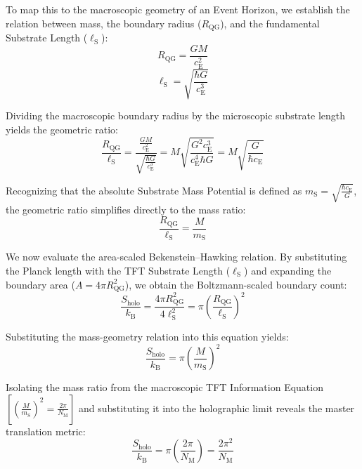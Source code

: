 To map this to the macroscopic geometry of an Event Horizon, we establish the relation between mass, the boundary radius ($R_{\mathrm{QG}}$), and the fundamental Substrate Length ($\ell_{\mathrm{S}}$):
\begin{equation}
    R_{\mathrm{QG}} = \frac{GM}{c_{\mathrm{E}}^2}
\end{equation}
\begin{equation}
    \ell_{\mathrm{S}} = \sqrt{\frac{\hbar G}{c_{\mathrm{E}}^3}}
\end{equation}

Dividing the macroscopic boundary radius by the microscopic substrate length yields the geometric ratio:
\begin{equation}
    \frac{R_{\mathrm{QG}}}{\ell_{\mathrm{S}}} = \frac{\frac{GM}{c_{\mathrm{E}}^2}}{\sqrt{\frac{\hbar G}{c_{\mathrm{E}}^3}}} = M \sqrt{\frac{G^2 c_{\mathrm{E}}^3}{c_{\mathrm{E}}^4 \hbar G}} = M \sqrt{\frac{G}{\hbar c_{\mathrm{E}}}}
\end{equation}

Recognizing that the absolute Substrate Mass Potential is defined as $m_{\mathrm{S}} = \sqrt{\frac{\hbar c_{\mathrm{E}}}{G}}$, the geometric ratio simplifies directly to the mass ratio:
\begin{equation}
    \frac{R_{\mathrm{QG}}}{\ell_{\mathrm{S}}} = \frac{M}{m_{\mathrm{S}}}
\end{equation}

We now evaluate the area-scaled Bekenstein--Hawking relation. By substituting the Planck length with the TFT Substrate Length ($\ell_{\mathrm{S}}$) and expanding the boundary area ($A = 4\pi R_{\mathrm{QG}}^2$), we obtain the Boltzmann-scaled boundary count:
\begin{equation}
    \frac{S_{\mathrm{holo}}}{k_{\mathrm{B}}} = \frac{4\pi R_{\mathrm{QG}}^2}{4\ell_{\mathrm{S}}^2} = \pi \left(\frac{R_{\mathrm{QG}}}{\ell_{\mathrm{S}}}\right)^2
\end{equation}

Substituting the mass-geometry relation into this equation yields:
\begin{equation}
    \frac{S_{\mathrm{holo}}}{k_{\mathrm{B}}} = \pi \left(\frac{M}{m_{\mathrm{S}}}\right)^2
\end{equation}

Isolating the mass ratio from the macroscopic TFT Information Equation $\left[\left(\frac{M}{m_{\mathrm{S}}}\right)^2 = \frac{2\pi}{N_{\mathrm{M}}}\right]$ and substituting it into the holographic limit reveals the master translation metric:
\begin{equation}
    \frac{S_{\mathrm{holo}}}{k_{\mathrm{B}}} = \pi \left(\frac{2\pi}{N_{\mathrm{M}}}\right) = \frac{2\pi^2}{N_{\mathrm{M}}}
\end{equation}

